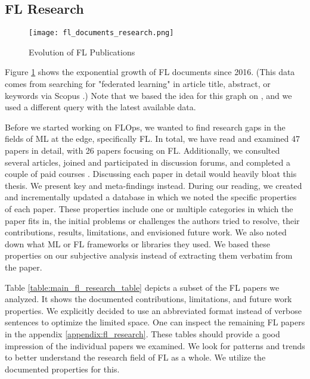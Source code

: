 \subsection{FL Research}\label{subsection:fl_research}

\begin{figure}[h]
    \centering
    \texttt{[image: fl\_documents\_research.png]}
    \caption{Evolution of FL Publications}
    \label{fig:fl_documents_research}
\end{figure}

Figure \ref{fig:fl_documents_research} shows the exponential growth of FL documents
since 2016. (This data comes from searching for "federated learning" in article title, abstract, or keywords via Scopus \cite{scopus_homepage}.)
Note that we based the idea for this graph on \cite{thesis:tum_fl_framework_comparison},
and we used a different query with the latest available data.

Before we started working on FLOps, we wanted to find research gaps in the fields of 
ML at the edge, specifically FL.
In total, we have read and examined 47 papers in detail, with 26 papers focusing on FL. 
Additionally, we consulted several articles,
joined and participated in discussion forums,
and completed a couple of paid courses \cite{udemy_homepage}.
Discussing each paper in detail would heavily bloat this thesis.
We present key and meta-findings instead.
During our reading, we created and incrementally updated a database in which we noted the specific properties of each paper.
These properties include one or multiple categories in which the paper fits in, the initial problems or challenges the authors tried to resolve,
their contributions, results, limitations, and envisioned future work.
We also noted down what ML or FL frameworks or libraries they used.
We based these properties on our subjective analysis instead of extracting them verbatim from the paper.

\begin{figure}[p]
    
\end{figure}

Table \ref{table:main_fl_research_table} depicts a subset of the FL papers we analyzed.
It shows the documented contributions, limitations, and future work properties.
We explicitly decided to use an abbreviated format instead of verbose sentences
to optimize the limited space.
One can inspect the remaining FL papers in the appendix \ref{appendix:fl_research}.
These tables should provide a good impression of the individual papers we examined.
We look for patterns and trends to better understand the research field of FL as a whole.
We utilize the documented properties for this.

